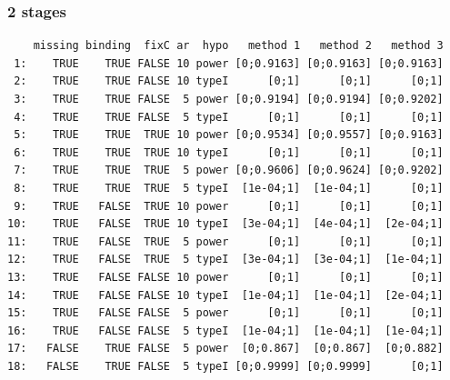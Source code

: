 \documentclass[12pt]{article}
\begin{document}
\subsubsection{2 stages}
\label{sec:org4f6d60c}
\begin{verbatim}
    missing binding  fixC ar  hypo   method 1   method 2   method 3
 1:    TRUE    TRUE FALSE 10 power [0;0.9163] [0;0.9163] [0;0.9163]
 2:    TRUE    TRUE FALSE 10 typeI      [0;1]      [0;1]      [0;1]
 3:    TRUE    TRUE FALSE  5 power [0;0.9194] [0;0.9194] [0;0.9202]
 4:    TRUE    TRUE FALSE  5 typeI      [0;1]      [0;1]      [0;1]
 5:    TRUE    TRUE  TRUE 10 power [0;0.9534] [0;0.9557] [0;0.9163]
 6:    TRUE    TRUE  TRUE 10 typeI      [0;1]      [0;1]      [0;1]
 7:    TRUE    TRUE  TRUE  5 power [0;0.9606] [0;0.9624] [0;0.9202]
 8:    TRUE    TRUE  TRUE  5 typeI  [1e-04;1]  [1e-04;1]      [0;1]
 9:    TRUE   FALSE  TRUE 10 power      [0;1]      [0;1]      [0;1]
10:    TRUE   FALSE  TRUE 10 typeI  [3e-04;1]  [4e-04;1]  [2e-04;1]
11:    TRUE   FALSE  TRUE  5 power      [0;1]      [0;1]      [0;1]
12:    TRUE   FALSE  TRUE  5 typeI  [3e-04;1]  [3e-04;1]  [1e-04;1]
13:    TRUE   FALSE FALSE 10 power      [0;1]      [0;1]      [0;1]
14:    TRUE   FALSE FALSE 10 typeI  [1e-04;1]  [1e-04;1]  [2e-04;1]
15:    TRUE   FALSE FALSE  5 power      [0;1]      [0;1]      [0;1]
16:    TRUE   FALSE FALSE  5 typeI  [1e-04;1]  [1e-04;1]  [1e-04;1]
17:   FALSE    TRUE FALSE  5 power  [0;0.867]  [0;0.867]  [0;0.882]
18:   FALSE    TRUE FALSE  5 typeI [0;0.9999] [0;0.9999]      [0;1]
\end{verbatim}

\clearpage
\end{document}
